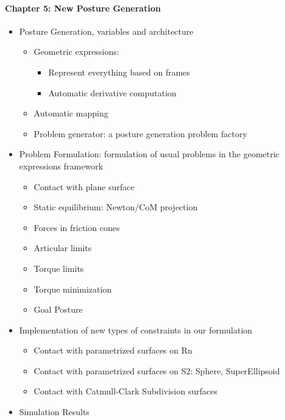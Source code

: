 \documentclass{article}
\begin{document}

\paragraph{Chapter 5: New Posture Generation}
\begin{itemize}
  \item{Posture Generation, variables and architecture}
    \begin{itemize}
      \item Geometric expressions:
        \begin{itemize}
          \item Represent everything based on frames
          \item Automatic derivative computation
        \end{itemize}
      \item Automatic mapping
      \item Problem generator: a posture generation problem factory
    \end{itemize}
  \item{Problem Formulation: formulation of usual problems in the geometric expressions framework}
    \begin{itemize}
      \item Contact with plane surface
      \item Static equilibrium: Newton/CoM projection
      \item Forces in friction cones
      \item Articular limits
      \item Torque limits
      \item Torque minimization
      \item Goal Posture
    \end{itemize}
  \item{Implementation of new types of constraints in our formulation}
    \begin{itemize}
      \item Contact with parametrized surfaces on Rn
      \item Contact with parametrized surfaces on S2: Sphere, SuperEllipsoid
      \item Contact with Catmull-Clark Subdivision surfaces
    \end{itemize}
  \item{Simulation Results}
\end{itemize}
\end{document}
